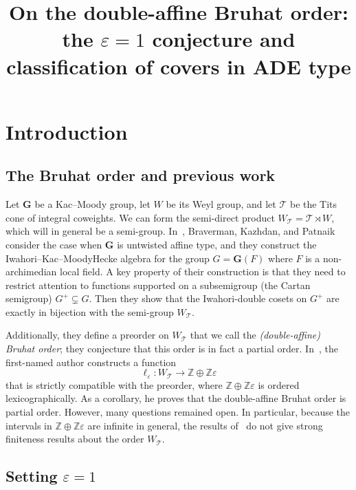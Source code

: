 \documentclass[ALCO,ThmDefs,Unicode]{cedram}
\title [On the double-affine Bruhat order] {On the double-affine Bruhat order: the $\varepsilon=1$ conjecture and classification of covers in ADE type}
\author[\initial{D.} Muthiah]{\firstname{Dinakar} \lastname{Muthiah}}
\author[\initial{D.} Orr]{\firstname{Daniel} \lastname{Orr}}
\newcommand{\bG}{\mathbf{G}}
\newcommand{\cT}{\mathcal{T}}
\newcommand{\ZZ}{\mathbb{Z}}
\newcommand{\eps}{\varepsilon}
\newcommand{\WTits}{W_{\TitsCone}}
\newcommand{\TitsCone}{\cT}
\begin{document}


\maketitle

\section{Introduction}

\subsection{The Bruhat order and previous work}

Let $\bG$ be a Kac--Moody group, let $W$ be its Weyl group, and let $\cT$ be the Tits cone of integral coweights. We can form the semi-direct product $\WTits = \cT \rtimes W$, which will in general be a semi-group. In~\cite{BKP}, Braverman, Kazhdan, and Patnaik consider the case when $\bG$ is untwisted affine type, and they construct the Iwahori--Kac--MoodyHecke algebra for the group $G = \bG(F)$ where $F$ is a non-archimedian local field. A key property of their construction is that they need to restrict attention to functions supported on a subsemigroup (the Cartan semigroup) $G^+ \subsetneq G$. Then they show that the Iwahori-double cosets on $G^+$ are exactly in bijection with the semi-group $\WTits$.

Additionally, they define a preorder on $\WTits$ that we call the \emph{(double-affine) Bruhat order}; they conjecture that this order is in fact a partial order. In~\cite{M}, the first-named author constructs a function
\begin{equation}\label{eq:22}
\ell_{\eps} : \WTits \rightarrow \ZZ \oplus \ZZ \eps
\end{equation}
that is strictly compatible with the preorder, where $\ZZ \oplus \ZZ \eps$ is ordered lexicographically. As a corollary, he proves that the double-affine Bruhat order is partial order. However, many questions remained open. In particular, because the intervals in $\ZZ \oplus \ZZ \eps$ are infinite in general, the results of~\cite{M} do not give strong finiteness results about the order $\WTits$.

\subsection{Setting \texorpdfstring{$\eps=1$}{epsilon=1}}
\end{document}
